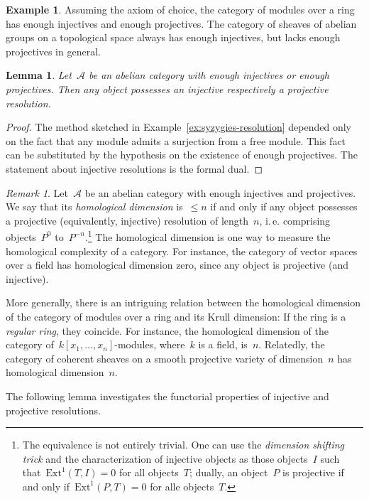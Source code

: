 \documentclass{amsart}
\makeatletter
\theoremstyle{definition}
\newtheorem{ex}[defn]{Example}
\theoremstyle{plain}
\newtheorem{lemma}[defn]{Lemma}
\theoremstyle{remark}
\newtheorem{rem}[defn]{Remark}
\newcommand{\A}{\mathcal{A}}
\newcommand{\Ext}{\mathrm{Ext}}
\newcommand{\?}{\,{:}\,}
\renewcommand{\_}{\mathpunct{.}\,}
\newcommand{\ie}{i.\,e.\@\xspace}
\makeatother
\begin{document}
\begin{ex}Assuming the axiom of choice, the category of modules over a ring has
enough injectives and enough projectives. The category of sheaves of abelian
groups on a topological space always has enough injectives, but lacks enough
projectives in general.\end{ex}

\begin{lemma}Let~$\A$ be an abelian category with enough injectives or enough
projectives. Then any object possesses an injective respectively a projective
resolution.\end{lemma}
\begin{proof}The method sketched in Example~\ref{ex:syzygies-resolution}
depended only on the fact that any module admits a surjection from a free
module. This fact can be substituted by the hypothesis on the existence of
enough projectives. The statement about injective resolutions is the formal
dual.\end{proof}

\begin{rem}Let~$\A$ be an abelian category with enough injectives and
projectives. We say that its \emph{homological dimension} is~$\leq n$ if and only
if any object possesses a projective (equivalently, injective) resolution of
length~$n$, \ie comprising objects~$P^0$ to~$P^{-n}$.\footnote{The equivalence
is not entirely trivial. One can use the \emph{dimension shifting trick}
and the characterization of injective objects as those objects~$I$ such
that~$\Ext^1(T,I) = 0$ for all objects~$T$; dually, an object~$P$ is projective
if and only if~$\Ext^1(P,T) = 0$ for alle objects~$T$.} The homological
dimension is one way to measure the homological complexity of a category. For
instance, the category of vector spaces over a field has homological dimension
zero, since any object is projective (and injective).

More generally, there is
an intriguing relation between the homological dimension of the category of
modules over a ring and its Krull dimension: If the ring is a \emph{regular
ring}, they coincide. For instance, the homological dimension of the category
of~$k[x_1,\ldots,x_n]$-modules, where~$k$ is a field, is~$n$. Relatedly, the
category of coherent sheaves on a smooth projective variety of
dimension~$n$ has homological dimension~$n$.
\end{rem}

The following lemma investigates the functorial properties of injective and
projective resolutions.
\end{document}
